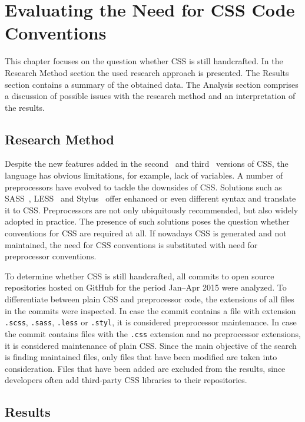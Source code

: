 \chapter{Evaluating the Need for CSS Code Conventions}
\label{sec:evaluating}

This chapter focuses on the question whether CSS is still handcrafted. In the
Research Method section the used research approach is presented. The Results
section contains a summary of the obtained data. The Analysis section
comprises a discussion of possible issues with the research method and
an interpretation of the results.

\section{Research Method}

Despite the new features added in the second~\cite{CSS2} and third~\cite{CSS3}
versions of CSS, the language has obvious limitations, for example, lack of
variables. A number of preprocessors have evolved to tackle the downsides of
CSS. Solutions such as SASS~\cite{SASS}, LESS~\cite{LESS} and
Stylus~\cite{Stylus} offer enhanced or even different syntax and translate it
to CSS. Preprocessors are not only ubiquitously recommended, but also widely
adopted in practice. The presence of such solutions poses the question whether
conventions for CSS are required at all. If nowadays CSS is generated and not
maintained, the need for CSS conventions is substituted with need for
preprocessor conventions.

To determine whether CSS is still handcrafted, all commits to open source
repositories hosted on GitHub for the period Jan--Apr 2015 were analyzed. To
differentiate between plain CSS and preprocessor code, the extensions of all
files in the commits were inspected. In case the commit contains a file with
extension \texttt{.scss}, \texttt{.sass}, \texttt{.less} or \texttt{.styl}, it
is considered preprocessor maintenance. In case the commit contains files with
the \texttt{.css} extension and no preprocessor extensions, it is considered
maintenance of plain CSS. Since the main objective of the search is finding
maintained files, only files that have been modified are taken into
consideration. Files that have been added are excluded from the results, since
developers often add third-party CSS libraries to their repositories.


\section{Results}

